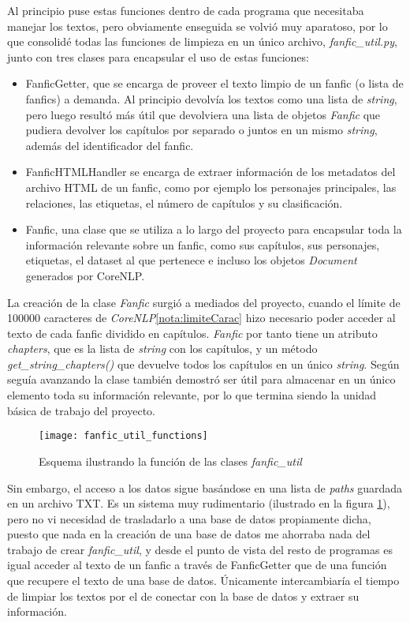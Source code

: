 \documentclass{pre-tfg}
\begin{document}
Al principio puse estas funciones dentro de cada programa que necesitaba manejar los textos, pero obviamente enseguida se volvió muy aparatoso, por lo que consolidé todas las funciones de limpieza en un único archivo, \textit{fanfic\_util.py}, junto con tres clases para encapsular el uso de estas funciones:

\begin{itemize}
	\item FanficGetter, que se encarga de proveer el texto limpio de un fanfic (o lista de fanfics) a demanda. Al principio devolvía los textos como una lista de \textit{string}, pero luego resultó más útil que devolviera una lista de objetos \textit{Fanfic} que pudiera devolver los capítulos por separado o juntos en un mismo \textit{string}, además del identificador del fanfic.
	\item FanficHTMLHandler se encarga de extraer información de los metadatos del archivo HTML de un fanfic, como por ejemplo los personajes principales, las relaciones, las etiquetas, el número de capítulos y su clasificación.
	\item Fanfic, una clase que se utiliza a lo largo del proyecto para encapsular toda la información relevante sobre un fanfic, como sus capítulos, sus personajes, etiquetas, el dataset al que pertenece e incluso los objetos \textit{Document} generados por CoreNLP.
\end{itemize}

La creación de la clase \textit{Fanfic} surgió a mediados del proyecto, cuando el límite de 100000 caracteres de \textit{CoreNLP}\ref{nota:limiteCarac} hizo necesario poder acceder al texto de cada fanfic dividido en capítulos. \textit{Fanfic} por tanto tiene un atributo \textit{chapters}, que es la lista de \textit{string} con los capítulos, y un método \textit{get\_string\_chapters()} que devuelve todos los capítulos en un único \textit{string}. Según seguía avanzando la clase también demostró ser útil para almacenar en un único elemento toda su información relevante, por lo que termina siendo la unidad básica de trabajo del proyecto.

\begin{figure}
	\centering
	\texttt{[image: fanfic\_util\_functions]}
	\caption{Esquema ilustrando la función de las clases \textit{fanfic\_util}}
	\label{fig:fanfic_util}
\end{figure}

Sin embargo, el acceso a los datos sigue basándose en una lista de \textit{paths} guardada en un archivo TXT. Es un sistema muy rudimentario (ilustrado en la figura \ref{fig:fanfic_util}), pero no vi necesidad de trasladarlo a una base de datos propiamente dicha, puesto que nada en la creación de una base de datos me ahorraba nada del trabajo de crear \textit{fanfic\_util}, y desde el punto de vista del resto de programas es igual acceder al texto de un fanfic a través de FanficGetter que de una función que recupere el texto de una base de datos. Únicamente intercambiaría el tiempo de limpiar los textos por el de conectar con la base de datos y extraer su información.
\end{document}
